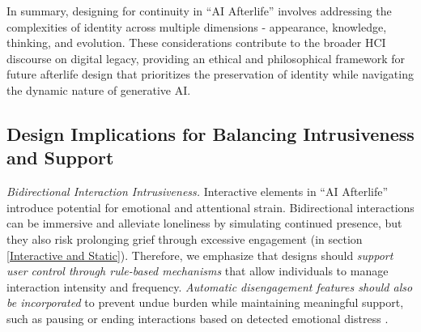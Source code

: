 In summary, designing for continuity in ``AI Afterlife'' involves addressing the complexities of identity across multiple dimensions - appearance, knowledge, thinking, and evolution. These considerations contribute to the broader HCI discourse on digital legacy, providing an ethical and philosophical framework for future afterlife design that prioritizes the preservation of identity while navigating the dynamic nature of generative AI. 


\subsection{Design Implications for Balancing Intrusiveness and Support} \label{balance intrusiveness and support}


\textit{Bidirectional Interaction Intrusiveness.}
Interactive elements in ``AI Afterlife'' introduce potential for emotional and attentional strain. Bidirectional interactions can be immersive and alleviate loneliness by simulating continued presence, but they also risk prolonging grief through excessive engagement (in section \ref{Interactive and Static}). 
Therefore, we emphasize that designs should \textit{support user control through rule-based mechanisms} that allow individuals to manage interaction intensity and frequency. \textit{Automatic disengagement features should also be incorporated} to prevent undue burden while maintaining meaningful support, such as pausing or ending interactions based on detected emotional distress \cite{slovak2023designing, benke2020chatbot}.


